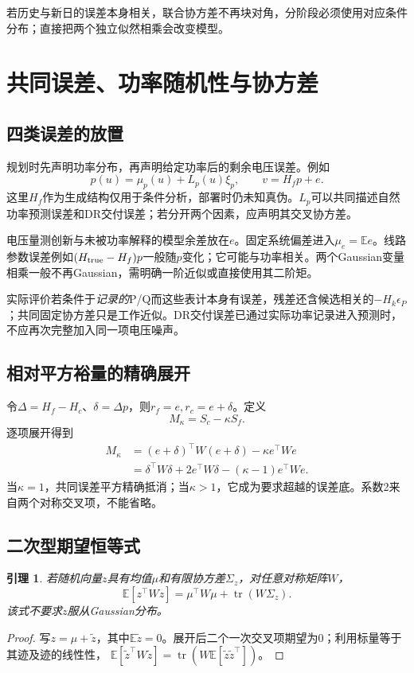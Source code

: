 \documentclass[UTF8,11pt,a4paper,fontset=fandol]{ctexart}
\newcommand{\E}{\mathbb E}
\newcommand{\tr}{\operatorname{tr}}
\newtheorem{lemma}[proposition]{引理}
\numberwithin{equation}{section}
\begin{document}
若历史与新日的误差本身相关，联合协方差不再块对角，分阶段必须使用对应条件分布；直接把两个独立似然相乘会改变模型。

\section{共同误差、功率随机性与协方差}
\label{sec:cov}
\subsection{四类误差的放置}
规划时先声明功率分布，再声明给定功率后的剩余电压误差。例如
\begin{equation}
p(u)=\mu_p(u)+L_p(u)\xi_p,\qquad
v=H_fp+e.
\label{eq:powernoise}
\end{equation}
这里$H_f$作为生成结构仅用于条件分析，部署时仍未知真伪。$L_p$可以共同描述自然功率预测误差和DR交付误差；若分开两个因素，应声明其交叉协方差。

电压量测创新与未被功率解释的模型余差放在$e$。固定系统偏差进入$\mu_e=\E e$。线路参数误差例如$(H_{\rm true}-H_f)p$一般随$p$变化；它可能与功率相关。两个Gaussian变量相乘一般不再Gaussian，需明确一阶近似或直接使用其二阶矩。

实际评价若条件于\emph{记录的}P/Q而这些表计本身有误差，残差还含候选相关的$-H_k\epsilon_P$；共同固定协方差只是工作近似。DR交付误差已通过实际功率记录进入预测时，不应再次完整加入同一项电压噪声。

\subsection{相对平方裕量的精确展开}
令$\Delta=H_f-H_c$、$\delta=\Delta p$，则$r_f=e,r_c=e+\delta$。定义
\begin{equation}
M_\kappa=S_c-\kappa S_f.
\end{equation}
逐项展开得到
\begin{align}
M_\kappa
&=(e+\delta)^\top W(e+\delta)-\kappa e^\top We\\
&=\delta^\top W\delta+2e^\top W\delta
-(\kappa-1)e^\top We.
\label{eq:expand}
\end{align}
当$\kappa=1$，共同误差平方精确抵消；当$\kappa>1$，它成为要求超越的误差底。系数2来自两个对称交叉项，不能省略。

\subsection{二次型期望恒等式}
\begin{lemma}\label{lem:moment}
若随机向量$z$具有均值$\mu$和有限协方差$\Sigma_z$，对任意对称矩阵$W$，
\begin{equation}
\E[z^\top Wz]=\mu^\top W\mu+\tr(W\Sigma_z).
\label{eq:moment}
\end{equation}
该式不要求$z$服从Gaussian分布。
\end{lemma}
\begin{proof}
写$z=\mu+\widetilde z$，其中$\E\widetilde z=0$。展开后二个一次交叉项期望为0；利用标量等于其迹及迹的线性性，
$\E[\widetilde z^\top W\widetilde z]=\tr(W\E[\widetilde z\widetilde z^\top])$。
\end{proof}
\end{document}
